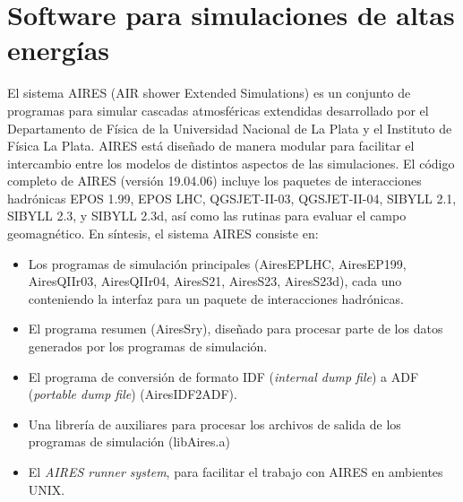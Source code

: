 \section[Software para simulaciones]{Software para simulaciones de altas energías}
El sistema AIRES (AIR shower Extended Simulations) es un conjunto de programas para simular cascadas atmosféricas extendidas desarrollado por el Departamento de Física de la Universidad Nacional de La Plata y el Instituto de Física La Plata. AIRES está diseñado de manera modular para facilitar el intercambio entre los modelos de distintos aspectos de las simulaciones. El código completo de AIRES (versi\'on 19.04.06) incluye los paquetes de interacciones hadrónicas EPOS 1.99, EPOS LHC, QGSJET-II-03, QGSJET-II-04, SIBYLL 2.1, SIBYLL 2.3, y SIBYLL 2.3d, así como las rutinas para evaluar el campo geomagnético. En síntesis, el sistema AIRES consiste en:
	\begin{itemize}
	\item Los programas de simulación principales (AiresEPLHC, AiresEP199, AiresQIIr03, AiresQIIr04, AiresS21, AiresS23, AiresS23d), cada uno conteniendo la interfaz para un paquete de interacciones hadrónicas.
	\item El programa resumen (AiresSry), diseñado para procesar parte de los datos generados por los programas de simulación.
	\item El programa de conversión de formato IDF (\textit{internal dump file}) a ADF (\textit{portable dump file}) (AiresIDF2ADF).
	\item Una librería de auxiliares para procesar los archivos de salida de los programas de simulación (libAires.a)
	\item El \textit{AIRES runner system}, para facilitar el trabajo con AIRES en ambientes UNIX. 
	\end{itemize}
	
